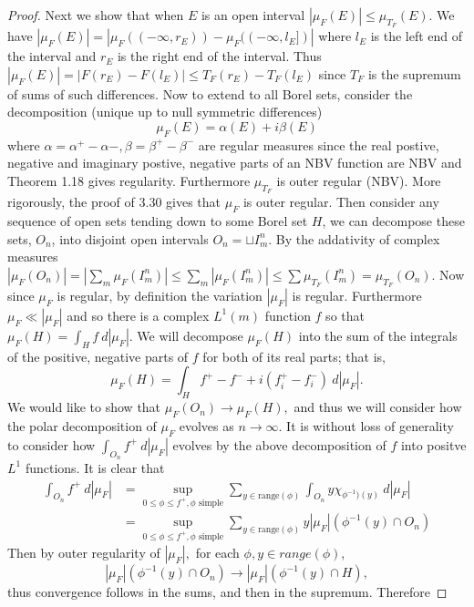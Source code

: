 \documentclass[11pt]{amsart}
\theoremstyle{definition}
\numberwithin{theorem}{section}
\numberwithin{definition}{section}
\numberwithin{equation}{section}
\begin{document}
\begin{proof}
Next we show that when $E$ is an open interval $|\mu_F(E)| \leq \mu_{T_F}(E).$ We have $|\mu_F(E)| = |\mu_F((-\infty, r_E)) - \mu_F((-\infty, l_E])| $ where $l_E$ is the left end of the interval and $r_E$ is the right end of the interval.  Thus $|\mu_F(E)| = |F(r_E) - F(l_E)| \leq T_F(r_E) -T_F(l_E)$ since $T_F$ is the supremum of sums of such differences. Now to extend to all Borel sets, consider the decomposition (unique up to null symmetric differences)
\begin{equation*}
	\mu_F(E) = \alpha(E) + i\beta(E)
\end{equation*}
where $\alpha = \alpha^+ - \alpha-, \beta = \beta^+ - \beta^-$ are regular measures since the real postive, negative and imaginary postive, negative parts of an NBV function are NBV and Theorem 1.18 gives regularity. Furthermore $\mu_{T_F}$ is outer regular (NBV). More rigorously, the proof of 3.30 gives that $\mu_F$ is outer regular. Then consider any sequence of open sets tending down to some Borel set $H$, we can decompose these sets, $O_n$, into disjoint open intervals $O_n = \sqcup I_m^n$. By the addativity of complex measures $|\mu_F(O_n)| = |\sum_m \mu_F( I_m^n)| \leq \sum_m |\mu_F( I_m^n)| \leq \sum \mu_{T_F}(I_m^n) = \mu_{T_F}(O_n)$. Now since $\mu_F$ is regular, by definition the variation $|\mu_F|$ is regular. Furthermore $\mu_F \ll |\mu_F|$ and so there is a complex $L^1(m)$ function $f$ so that $\mu_F(H) = \int_H f\ d|\mu_F|.$  We will decompose $\mu_F(H)$ into the sum of the integrals of the positive, negative parts of $f$ for both of its real parts; that is, $$\mu_F(H) = \int_H f^+ - f^- + i(f^+_i - f^-_i)\ d|\mu_F|.$$
We would like to show that $\mu_F(O_n) \to \mu_F(H),$ and thus we will consider how the polar decomposition of $\mu_F$ evolves as $n \to \infty$. It is without loss of generality to consider how $\int_{O_n} f^+\ d|\mu_F|$ evolves by the above decomposition of $f$ into positve $L^1$ functions. It is clear that
\begin{equation*}
\begin{aligned}	
	\int_{O_n} f^+\ d|\mu_F| &= \sup_{0 \leq \phi \leq f^+, \phi\text{ simple}} \sum_{y \in \text{range}(\phi)} \int_{O_n} y \chi_{\phi^{-1})(y)}\ d|\mu_F| \\
	&= \sup_{0 \leq \phi \leq f^+, \phi\text{ simple}} \sum_{y \in \text{range}(\phi)}  y |\mu_F|(\phi^{-1}(y) \cap O_n)
\end{aligned}
\end{equation*}
Then by outer regularity of $|\mu_F|, $  for each $\phi, y \in range(\phi)$, $$|\mu_F|(\phi^{-1}(y) \cap O_n) \to |\mu_F|(\phi^{-1}(y) \cap H),$$ thus convergence follows in the sums, and then in the supremum. Therefore

\end{proof}
\end{document}
